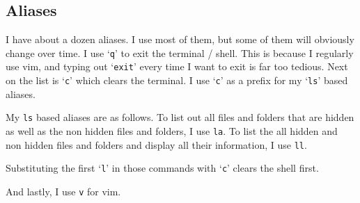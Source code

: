 \documentclass[12pt, a4paper]{article}
\begin{document}
\subsection{Aliases}

I have about a dozen aliases.
I use most of them, but some of them will obviously change over time.
I use `\texttt{q}' to exit the terminal / shell.
This is because I regularly use vim, and typing out `\texttt{exit}' every time I want to exit is far too tedious.
Next on the list is `\texttt{c}' which clears the terminal.
I use `\texttt{c}' as a prefix for my `\texttt{ls}' based aliases.

My \texttt{ls} based aliases are as follows.
To list out all files and folders that are hidden as well as the non hidden files and folders, I use \texttt{la}.
To list the all hidden and non hidden files and folders and display all their information, I use \texttt{ll}.

Substituting the first `\texttt{l}' in those commands with `\texttt{c}' clears the shell first.

And lastly, I use \texttt{v} for vim.
\end{document}
